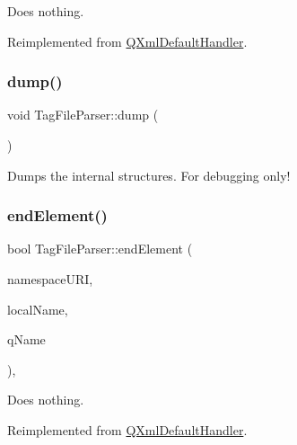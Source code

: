 Does nothing. 

Reimplemented from \mbox{\hyperlink{class_q_xml_default_handler_a40c64e4f7fc445abeb753ef11c75f84a}{Q\+Xml\+Default\+Handler}}.

\mbox{\label{class_tag_file_parser_adce233a37587ff0cc0753ae672f67d25}} 
\subsubsection{\texorpdfstring{dump()}{dump()}}
{\footnotesize\ttfamily void Tag\+File\+Parser\+::dump (\begin{DoxyParamCaption}{ }\end{DoxyParamCaption})}

Dumps the internal structures. For debugging only! \mbox{\label{class_tag_file_parser_aeb0fd2877b6d5fc40a15f7c7bec19ee0}} 
\subsubsection{\texorpdfstring{endElement()}{endElement()}}
{\footnotesize\ttfamily bool Tag\+File\+Parser\+::end\+Element (\begin{DoxyParamCaption}\item[{const \mbox{\hyperlink{class_q_string}{Q\+String}} \&}]{namespace\+U\+RI,  }\item[{const \mbox{\hyperlink{class_q_string}{Q\+String}} \&}]{local\+Name,  }\item[{const \mbox{\hyperlink{class_q_string}{Q\+String}} \&}]{q\+Name }\end{DoxyParamCaption})\hspace{0.3cm}{\ttfamily [inline]}, {\ttfamily [virtual]}}

Does nothing. 

Reimplemented from \mbox{\hyperlink{class_q_xml_default_handler_ae5d92a2fbae15a793aedf725b62b16c2}{Q\+Xml\+Default\+Handler}}.

\mbox{\label{class_tag_file_parser_a947ca98759d61b5cf3d920a7d98fa828}} 
